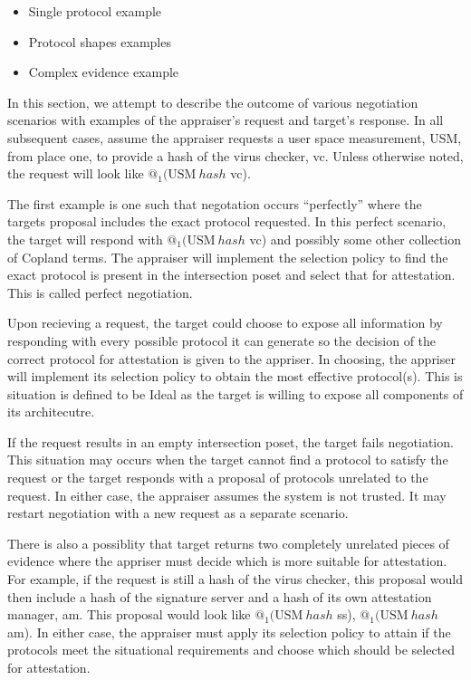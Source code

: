 \documentclass[sigconf,authordraft]{acmart}
\begin{document}
\begin{itemize}
\item Single protocol example
\item Protocol shapes examples
\item Complex evidence example

\end{itemize}

  
In this section, we attempt to describe the outcome of various
negotiation scenarios with examples of the appraiser's request and
target's response. In all subsequent cases, assume the appraiser
requests a user space measurement, USM, from place one, to provide a
hash of the virus checker, vc. Unless otherwise noted, the request
will look like $@_1 (\text{USM}\: hash$ vc).

The first example is one such that negotation occurs ``perfectly''
where the targets proposal includes the exact protocol requested. In
this \gls{perfect} scenario, the target will respond with
$@_1 (\text{USM}\: hash$ vc) and possibly some other collection of
Copland terms. The appraiser will implement the selection policy to
find the exact protocol is present in the intersection poset and
select that for attestation. This is called perfect negotiation.

Upon recieving a request, the target could choose to expose all
information by responding with every possible protocol it can generate
so the decision of the correct protocol for attestation is given to
the appriser. In choosing, the appriser will implement its selection
policy to obtain the most effective protocol(s). This is situation is
defined to be \gls{Ideal} as the target is willing to expose all
components of its architecutre.

If the request results in an empty intersection poset, the target
fails negotiation. This situation may occurs when the target cannot
find a protocol to satisfy the request or the target responds with a
proposal of protocols unrelated to the request. In either case, the
appraiser assumes the system is not trusted. It may restart
negotiation with a new request as a separate scenario.

There is also a possiblity that target returns two completely
unrelated pieces of evidence where the appriser must decide which is
more suitable for attestation. For example, if the request is still a
hash of the virus checker, this proposal would then include a hash of
the signature server and a hash of its own attestation manager,
am. This proposal would look like {$@_1 (\text{USM}\: hash$ ss),
  $@_1 (\text{USM}\: hash$ am)}. In either case, the appraiser must
apply its selection policy to attain if the protocols meet the
situational requirements and choose which should be selected for
attestation.
\end{document}
